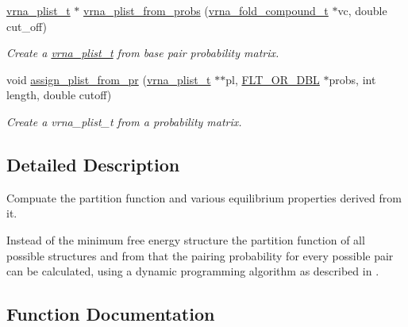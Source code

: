 \begin{DoxyCompactItemize}
\item 
\hyperlink{group__data__structures_ga8e4eb5e1bfc95776559575beb359af87}{vrna\+\_\+plist\+\_\+t} $\ast$ \hyperlink{group__struct__utils_gaa3bf26a0ee2e9f2225afbaee44a37264}{vrna\+\_\+plist\+\_\+from\+\_\+probs} (\hyperlink{group__fold__compound_ga1b0cef17fd40466cef5968eaeeff6166}{vrna\+\_\+fold\+\_\+compound\+\_\+t} $\ast$vc, double cut\+\_\+off)
\begin{DoxyCompactList}\small\item\em Create a \hyperlink{group__data__structures_ga8e4eb5e1bfc95776559575beb359af87}{vrna\+\_\+plist\+\_\+t} from base pair probability matrix. \end{DoxyCompactList}\item 
void \hyperlink{group__struct__utils_gacfdacc119b749bccf939de445afea07b}{assign\+\_\+plist\+\_\+from\+\_\+pr} (\hyperlink{group__data__structures_ga8e4eb5e1bfc95776559575beb359af87}{vrna\+\_\+plist\+\_\+t} $\ast$$\ast$pl, \hyperlink{group__data__structures_ga31125aeace516926bf7f251f759b6126}{F\+L\+T\+\_\+\+O\+R\+\_\+\+D\+BL} $\ast$probs, int length, double cutoff)
\begin{DoxyCompactList}\small\item\em Create a vrna\+\_\+plist\+\_\+t from a probability matrix. \end{DoxyCompactList}\end{DoxyCompactItemize}


\subsection{Detailed Description}
Compuate the partition function and various equilibrium properties derived from it. 

Instead of the minimum free energy structure the partition function of all possible structures and from that the pairing probability for every possible pair can be calculated, using a dynamic programming algorithm as described in \cite{mccaskill:1990}. 

\subsection{Function Documentation}
